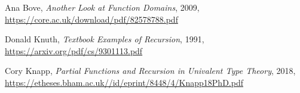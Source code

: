 \documentclass[declaration,mgr,english,shortabstract]{iithesis}
\begin{document}
\begin{thebibliography}{1}
    Ana Bove,
    \textit{Another Look at Function Domains},
    2009, \\
    \url{https://core.ac.uk/download/pdf/82578788.pdf}

    Donald Knuth,
    \textit{Textbook Examples of Recursion},
    1991, \\
    \url{https://arxiv.org/pdf/cs/9301113.pdf}

    Cory Knapp,
    \textit{Partial Functions and Recursion in Univalent Type
    Theory},
    2018, \\
    \url{https://etheses.bham.ac.uk//id/eprint/8448/4/Knapp18PhD.pdf}
\end{thebibliography}
\end{document}
